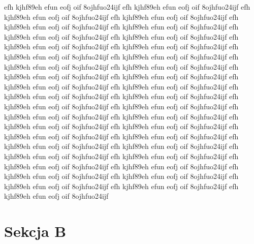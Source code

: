 \documentclass[a4paper,12pt]{book} %
\begin{document}
efh kjhf89eh efun eofj oif 8ojhfuo24ijf
efh kjhf89eh efun eofj oif 8ojhfuo24ijf
efh kjhf89eh efun eofj oif 8ojhfuo24ijf
efh kjhf89eh efun eofj oif 8ojhfuo24ijf
efh kjhf89eh efun eofj oif 8ojhfuo24ijf
efh kjhf89eh efun eofj oif 8ojhfuo24ijf
efh kjhf89eh efun eofj oif 8ojhfuo24ijf
efh kjhf89eh efun eofj oif 8ojhfuo24ijf
efh kjhf89eh efun eofj oif 8ojhfuo24ijf
efh kjhf89eh efun eofj oif 8ojhfuo24ijf
efh kjhf89eh efun eofj oif 8ojhfuo24ijf
efh kjhf89eh efun eofj oif 8ojhfuo24ijf
efh kjhf89eh efun eofj oif 8ojhfuo24ijf
efh kjhf89eh efun eofj oif 8ojhfuo24ijf
efh kjhf89eh efun eofj oif 8ojhfuo24ijf
efh kjhf89eh efun eofj oif 8ojhfuo24ijf
efh kjhf89eh efun eofj oif 8ojhfuo24ijf
efh kjhf89eh efun eofj oif 8ojhfuo24ijf
efh kjhf89eh efun eofj oif 8ojhfuo24ijf
efh kjhf89eh efun eofj oif 8ojhfuo24ijf
efh kjhf89eh efun eofj oif 8ojhfuo24ijf
efh kjhf89eh efun eofj oif 8ojhfuo24ijf
efh kjhf89eh efun eofj oif 8ojhfuo24ijf
efh kjhf89eh efun eofj oif 8ojhfuo24ijf
efh kjhf89eh efun eofj oif 8ojhfuo24ijf
efh kjhf89eh efun eofj oif 8ojhfuo24ijf
efh kjhf89eh efun eofj oif 8ojhfuo24ijf
efh kjhf89eh efun eofj oif 8ojhfuo24ijf
efh kjhf89eh efun eofj oif 8ojhfuo24ijf
efh kjhf89eh efun eofj oif 8ojhfuo24ijf
efh kjhf89eh efun eofj oif 8ojhfuo24ijf
efh kjhf89eh efun eofj oif 8ojhfuo24ijf
efh kjhf89eh efun eofj oif 8ojhfuo24ijf
efh kjhf89eh efun eofj oif 8ojhfuo24ijf
efh kjhf89eh efun eofj oif 8ojhfuo24ijf
efh kjhf89eh efun eofj oif 8ojhfuo24ijf
efh kjhf89eh efun eofj oif 8ojhfuo24ijf
efh kjhf89eh efun eofj oif 8ojhfuo24ijf
efh kjhf89eh efun eofj oif 8ojhfuo24ijf

\section{Sekcja B}
\end{document}
